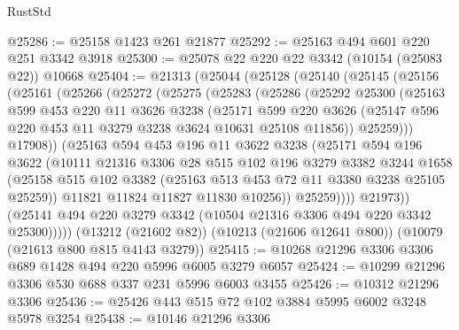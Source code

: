 \begin{lexlean}{RustStd}
\begin{coremodule}
@25286 := @25158 @1423 @261 @21877
@25292 := @25163 @494 @601 @220 @251 @3342 @3918
@25300 := @25078 @22 @220 @22 @3342 (@10154 (@25083 @22)) @10668
@25404 := @21313
    (@25044
      (@25128
        (@25140
          (@25145
            (@25156
              (@25161
                (@25266
                  (@25272
                    (@25275
                      (@25283
                        (@25286
                          (@25292
                            @25300
                            (@25163
                              @599
                              @453
                              @220
                              @11
                              @3626
                              @3238
                              (@25171
                                @599
                                @220
                                @3626
                                (@25147 @596 @220 @453 @11 @3279 @3238 @3624 @10631 @25108 @11856))
                              @25259)))
                        @17908))
                    (@25163
                      @594
                      @453
                      @196
                      @11
                      @3622
                      @3238
                      (@25171
                        @594
                        @196
                        @3622
                        (@10111
                          @21316
                          @3306
                          @28
                          @515
                          @102
                          @196
                          @3279
                          @3382
                          @3244
                          @1658
                          (@25158
                            @515
                            @102
                            @3382
                            (@25163 @513 @453 @72 @11 @3380 @3238 @25105 @25259))
                          @11821
                          @11824
                          @11827
                          @11830
                          @10256))
                      @25259))))
              @21973))
          (@25141 @494 @220 @3279 @3342 (@10504 @21316 @3306 @494 @220 @3342 @25300)))))
    (@13212 (@21602 @82))
    (@10213 (@21606 @12641 @800))
    (@10079 (@21613 @800 @815 @4143 @3279))
@25415 := @10268 @21296 @3306 @3306 @689 @1428 @494 @220 @5996 @6005 @3279 @6057
@25424 := @10299 @21296 @3306 @530 @688 @337 @231 @5996 @6003 @3455
@25426 := @10312 @21296 @3306
@25436 := @25426 @443 @515 @72 @102 @3884 @5995 @6002 @3248 @5978 @3254
@25438 := @10146 @21296 @3306

\end{coremodule}
\end{lexlean}
